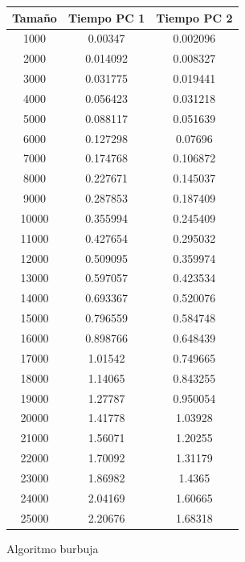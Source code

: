 \documentclass[12pt,spanish]{article}
\begin{document}
\begin{figure}[H]
\newline
\begin{tabular}{|c|c|c|}
\hline
\textbf{Tamaño} & \textbf{Tiempo PC 1} & \textbf{Tiempo PC 2} \\
\hline
1000 & 0.00347 & 0.002096 \\
\hline
2000 & 0.014092 & 0.008327 \\
\hline
3000 & 0.031775 & 0.019441 \\
\hline
4000 & 0.056423 & 0.031218 \\
\hline
5000 & 0.088117 & 0.051639\\
\hline
6000 & 0.127298 & 0.07696\\
\hline
7000 & 0.174768 & 0.106872\\
\hline
8000 & 0.227671 & 0.145037\\
\hline
9000 & 0.287853 & 0.187409\\
\hline
10000 & 0.355994 & 0.245409\\
\hline
11000 & 0.427654 & 0.295032\\
\hline
12000 & 0.509095 & 0.359974\\
\hline
13000 & 0.597057 & 0.423534\\
\hline
14000 & 0.693367 & 0.520076\\
\hline
15000 & 0.796559 & 0.584748\\
\hline
16000 & 0.898766 & 0.648439\\
\hline
17000 & 1.01542 & 0.749665\\
\hline
18000 & 1.14065 & 0.843255\\
\hline
19000 & 1.27787 & 0.950054\\
\hline
20000 & 1.41778 & 1.03928\\
\hline
21000 & 1.56071 & 1.20255\\
\hline
22000 & 1.70092 & 1.31179\\
\hline
23000 & 1.86982 & 1.4365\\
\hline
24000 & 2.04169 & 1.60665\\
\hline
25000 & 2.20676 & 1.68318 \\
\hline
\end{tabular}
\caption{Algoritmo burbuja}
\end{figure}
\end{document}
